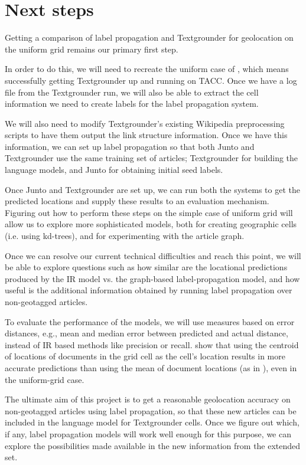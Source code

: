 \section{Next steps}
Getting a comparison of label propagation and Textgrounder for geolocation on
the uniform grid remains our primary first step.
\par
In order to do this, we will need to recreate the uniform case of
\cite{rolleretal:12}, which means successfully getting Textgrounder up and
running on TACC.
Once we have a log file from the Textgrounder run, we will also be able to extract the cell information we
need to create labels for the label propagation system. 
\par 
We will also need to modify Textgrounder's existing Wikipedia preprocessing
scripts to have them output the link structure information. Once we have this
information, we can set up label propagation so that both Junto and
Textgrounder use the same training set of articles; Textgrounder for building
the language models, and Junto for obtaining initial seed labels.
\par
Once Junto and Textgrounder are set up, we can run both the systems to get the predicted locations and supply these results to an evaluation mechanism.
Figuring out how to perform these steps on the simple case of uniform grid will allow us to
explore more sophisticated models, both for creating geographic cells (i.e.
using kd-trees), and for experimenting with the article graph.
\par
Once we can resolve our current technical difficulties and reach this point, we
will be able to explore questions such as how similar are the locational
predictions produced by the IR model vs. the graph-based label-propagation
model, and how useful is the additional information obtained by running label propagation over non-geotagged articles.
\par
To evaluate the performance of the models, we will use measures based on error distances, e.g., mean and median error between predicted and actual distance, instead of IR based methods like precision or recall.
\cite{rolleretal:12} show that using the centroid of locations of documents in the grid cell as the cell's location results in more accurate predictions than using the mean of document locations (as in \cite{wing-baldridge:11}), even in the uniform-grid case.
\par
The ultimate aim of this project is to get a reasonable geolocation accuracy on non-geotagged articles using label propagation, so that these new articles can be included in the language model for Textgrounder cells.
Once we figure out which, if any, label propagation models will work well
enough for this purpose, we can explore the possibilities made available in the
new information from the extended set.
